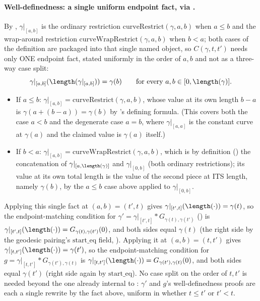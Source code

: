 \begin{definition}
  \paragraph{Well-definedness: a single uniform endpoint fact, via .} By
  , $\gamma|_{[a,b]}$ is the ordinary restriction $\mathrm{curveRestrict}(\gamma,a,b)$
  when $a \le b$ and the wrap-around restriction $\mathrm{curveWrapRestrict}(\gamma,a,b)$ when
  $b < a$; both cases of the definition are packaged into that single named object, so $C(\gamma,t,t')$
  needs only ONE endpoint fact, stated uniformly in the order of $a,b$ and not as a three-way case
  split:
  \[
    \gamma|_{[a,b]}(\length(\gamma|_{[a,b]})) = \gamma(b)
    \qquad \text{for every } a,b \in [0,\length(\gamma)]
    .
  \]
  \begin{itemize}
    \item If $a \le b$: $\gamma|_{[a,b]} = \mathrm{curveRestrict}(\gamma,a,b)$, whose value at its
      own length $b-a$ is $\gamma(a+(b-a))=\gamma(b)$ by 's defining formula.
      (This covers both the case $a<b$ and the degenerate case $a=b$, where $\gamma|_{[a,a]}$ is the
      constant curve at $\gamma(a)$ and the claimed value is $\gamma(a)$ itself.)
    \item If $b < a$: $\gamma|_{[a,b]} = \mathrm{curveWrapRestrict}(\gamma,a,b)$, which is by
      definition () the concatenation of $\gamma|_{[a,\length(\gamma)]}$
      and $\gamma|_{[0,b]}$ (both ordinary restrictions); its value at its own total length is the
      value of the second piece at ITS length, namely $\gamma(b)$, by the $a\le b$ case above
      applied to $\gamma|_{[0,b]}$.
  \end{itemize}
  Applying this single fact at $(a,b)=(t',t)$ gives $\gamma|_{[t',t]}(\length(\cdot))=\gamma(t)$, so
  the endpoint-matching condition for $\gamma' = \gamma|_{[t',t]} * G_{\gamma(t),\gamma(t')}$
  () is $\gamma|_{[t',t]}(\length(\cdot)) = G_{\gamma(t),\gamma(t')}(0)$, and
  both sides equal $\gamma(t)$ (the right side by the geodesic pairing's $\mathrm{start\_eq}$ field,
  ). Applying it at $(a,b)=(t,t')$ gives
  $\gamma|_{[t,t']}(\length(\cdot))=\gamma(t')$, so the endpoint-matching condition for
  $g = \gamma|_{[t,t']} * G_{\gamma(t'),\gamma(t)}$ is
  $\gamma|_{[t,t']}(\length(\cdot)) = G_{\gamma(t'),\gamma(t)}(0)$, and both sides equal $\gamma(t')$
  (right side again by $\mathrm{start\_eq}$). No case split on the order of $t,t'$ is needed beyond
  the one already internal to : $\gamma'$ and $g$'s well-definedness proofs are
  each a single rewrite by the fact above, uniform in whether $t \le t'$ or $t' < t$.


\end{definition}
